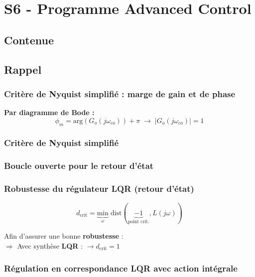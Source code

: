 \documentclass[document.tex]{subfiles}
\begin{document}
\section{S6 - Programme Advanced Control}

\subsection{Contenue}


\subsection{Rappel}

\subsubsection{Critère de Nyquist simplifié : marge de gain et de phase}

\textbf{Par diagramme de Bode : }
$$\phi_m = \text{arg}(G_o(j\omega_{co}))+ \pi \; \longrightarrow \; |G_o(j\omega_{co})|=1 $$


\subsubsection{Critère de Nyquist simplifié}


\subsubsection{Boucle ouverte pour le retour d'état}


\subsubsection{Robustesse du régulateur LQR (retour d'état)}


$$d_{\text{crit}}= \underbrace{\text{min}}_{\omega} \; \text{dist}(\underbrace{-1}_{\text{point crit.}},L(j \omega)) $$

Afin d'assurer une bonne \textbf{robustesse} : \\
$\Rightarrow$ Avec synthèse \textbf{LQR} : $\longrightarrow d_{\text{crit}} = 1$

\subsubsection{Régulation en correspondance LQR avec action intégrale}
\end{document}
